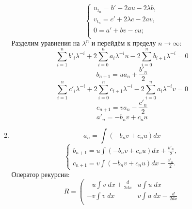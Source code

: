 \documentclass[12pt]{article}
\theoremstyle{definition}
\begin{document}
\begin{itemize}
\begin{enumerate}
\begin{equation}
            \left\{\begin{array}{l}
            u_{t_n}=b'+2au-2\lambda b,\\
            v_{t_n}=c'+2\lambda c-2av,\\
            0=a'+bv-cu;\\
            \end{array}\right.
        \end{equation}
        Разделим уравнения на $\lambda^n$ и перейдём к пределу $n\rightarrow\infty$:
        \begin{equation}
            \sum\limits_{i=1}^nb'_i\lambda^{-i}+2\sum\limits_{i=0}^na_i\lambda^{-i}u-2\sum\limits_{i=0}^nb_{i+1}\lambda^{-i}=0
        \end{equation}
        \begin{equation}
            \boxed{b_{n+1}=ua_n+\frac{b'_n}{2}}
        \end{equation}
        \begin{equation}
            \sum\limits_{i=1}^nc'_i\lambda^{-i}+2\sum\limits_{i=0}^nc_{i+1}\lambda^{-i}-2\sum\limits_{i=0}^na_i\lambda^{-i}v=0
        \end{equation}
        \begin{equation}
            \boxed{c_{n+1}=va_n-\frac{c'_n}{2}}
        \end{equation}
        \begin{equation}
            \boxed{a'_n=-b_nv+c_nu}
        \end{equation}
        \item
        \begin{equation}
            a_n=\int(-b_nv+c_nu)dx
        \end{equation}
        \begin{equation}
            \left\{\begin{array}{l}
            b_{n+1}=u\int(-b_nv+c_nu)dx+\frac{b'_n}{2},\\
            c_{n+1}=v\int(-b_nv+c_nu)dx-\frac{c'_n}{2}.
            \end{array}\right.
        \end{equation}
        Оператор рекурсии:
        \begin{equation}
            \boxed{R=\left(
            \begin{array}{cc}
             -u\int v\;dx+\frac{d}{2dx} & u\int u\;dx\\
             -v\int v\;dx & v\int u\;dx-\frac{d}{2dx}\\
        \end{array}
}
\end{equation}
\end{enumerate}
\end{itemize}
\end{document}
